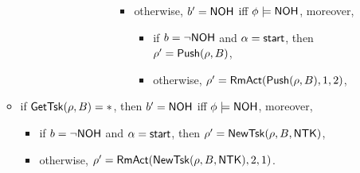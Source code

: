 \begin{itemize}
\begin{itemize}
\begin{itemize}
\begin{itemize}
\begin{itemize}
\begin{itemize}
\begin{itemize}
\begin{itemize}
							\item otherwise, $b' = {\sf NOH}$ iff $\phi \models {\sf NOH}$, moreover, 
							\begin{itemize}
								\item if $b = \neg {\sf NOH}$ and $\alpha = {\mathsf{start} }$, then $\rho'=\mathsf{Push}(\rho, B)$,
								\item otherwise, $\rho' = \mathsf{RmAct}(\mathsf{Push}(\rho, B), 1, 2)$, 
							\end{itemize}
						\end{itemize}
					\end{itemize}
				\end{itemize}
			\end{itemize}
		\end{itemize}
	\end{itemize}
	\item if $\mathsf{GetTsk}(\rho, B) = *$, then $b' = {\sf NOH}$ iff $\phi \models {\sf NOH}$, moreover, 
		\begin{itemize}
			\item if $b = \neg {\sf NOH}$ and $\alpha = {\mathsf{start} }$, then $\rho' = \mathsf{NewTsk}(\rho, B, {\sf NTK})$, 
			\item otherwise, $\rho' = \mathsf{RmAct}(\mathsf{NewTsk}(\rho, B, {\sf NTK}), 2, 1)$.
		\end{itemize}				
	\end{itemize}
\end{itemize}

